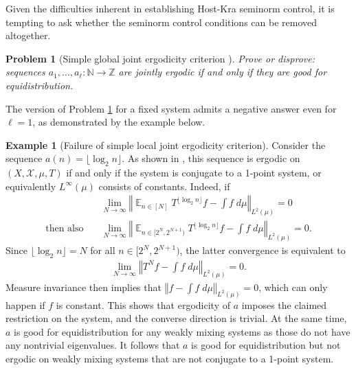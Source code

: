 \documentclass[11pt]{amsart}
\newtheorem{problem}{Problem}
\theoremstyle{definition}
\newtheorem{example}[lemma]{Example}
\DeclareMathOperator*{\E}{\mathbb{E}}
\newcommand{\N}{{\mathbb N}}
\newcommand{\Z}{{\mathbb Z}}
\newcommand{\CX}{{\mathcal X}}
\newcommand{\norm}[1]{\left\Vert #1\right\Vert}
\newcommand{\1}{{\mathbf{1}}}
\newcommand{\sfloor}[1]{{\lfloor #1 \rfloor}}
\begin{document}
Given the difficulties inherent in establishing Host-Kra seminorm control, it is tempting to ask whether the seminorm control conditions can be removed altogether.
\begin{problem}[Simple global joint ergodicity criterion {\cite[Problem 1]{Fr21}}]\label{Pr: joint ergodicity equivalent to equidistribution}
    Prove or disprove: sequences $a_1, \ldots, a_\ell:\N\to\Z$ are jointly ergodic if and only if they are good for equidistribution.
\end{problem}
The version of Problem \ref{Pr: joint ergodicity equivalent to equidistribution} for a fixed system admits a negative answer even for $\ell=1$, as demonstrated by the example below.
\begin{example}[Failure of simple local joint ergodicity criterion]
    Consider the sequence $a(n) = \sfloor{\log_2 n}$. As shown in \cite{DKKST25}, this sequence is ergodic on $(X, \CX, \mu, T)$ if and only if the system is conjugate to a 1-point system, or equivalently $L^\infty(\mu)$ consists of constants. Indeed, if %
    \begin{align*}
        &\lim_{N\to\infty}\norm{\E_{n\in[N]}T^{\sfloor{\log_2 n}} f - \int f\; d\mu}_{L^2(\mu)}=0\\ \textrm{then also}\quad &\lim_{N\to\infty}\norm{\E_{n\in[2^N, 2^{N+1})}T^{\sfloor{\log_2 n}} f - \int f\; d\mu}_{L^2(\mu)}=0.
    \end{align*}
    Since $\sfloor{\log_2 n} = N$ for all $n\in [2^N, 2^{N+1})$, the latter convergence is equivalent to 
    \begin{align*}
        \lim_{N\to\infty}\norm{T^N f - \int f\; d\mu}_{L^2(\mu)}=0.
    \end{align*}
    Measure invariance then implies that $\norm{f - \int f\; d\mu}_{L^2(\mu)} = 0$, which can only happen if $f$ is constant. This shows that ergodicity of $a$ imposes the claimed restriction on the system, and the converse direction is trivial. At the same time, $a$ is good for equidistribution for any weakly mixing systems as those do not have any nontrivial eigenvalues. It follows that $a$ is good for equidistribution but not ergodic on weakly mixing systems that are not conjugate to a 1-point system.
    \end{example}
\end{document}
